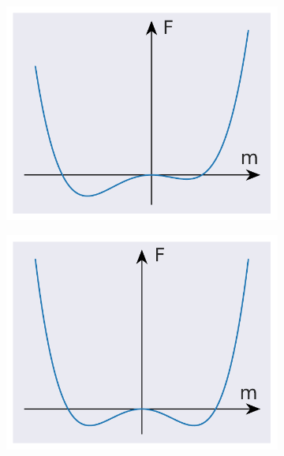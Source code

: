 \begin{figure}[H]
	\centering
	\begin{subfigure}{0.33\textwidth}
		\centering
		\includegraphics[width=\columnwidth]{figures/introduction/firstOrder-left-state.pdf}
	\end{subfigure}%
	\begin{subfigure}{0.33\textwidth}
		\centering
		\includegraphics[width=\columnwidth]{figures/introduction/firstOrder-center-state.pdf}
	\end{subfigure}%
	\begin{subfigure}{0.33\textwidth}
		\centering

\end{subfigure}
\end{figure}
